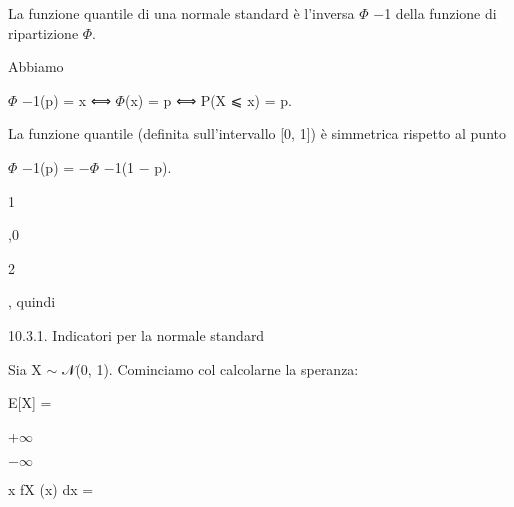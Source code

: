 \documentclass[a4paper,portrait,12pt]{article}
\begin{document}
\begin{flushleft}
La funzione quantile di una normale standard \`{e} l'inversa $\Phi$ $-$1 della funzione di ripartizione $\Phi$.
\end{flushleft}


\begin{flushleft}
Abbiamo
\end{flushleft}


\begin{flushleft}
$\Phi$ $-$1(p) = x ⟺ $\Phi$(x) = p ⟺ P(X ⩽ x) = p.
\end{flushleft}


\begin{flushleft}
La funzione quantile (definita sull'intervallo [0, 1]) \`{e} simmetrica rispetto al punto
\end{flushleft}


\begin{flushleft}
$\Phi$ $-$1(p) = $-$$\Phi$ $-$1(1 $-$ p).
\end{flushleft}





1


,0


2





\begin{flushleft}
, quindi
\end{flushleft}





\begin{flushleft}
10.3.1. Indicatori per la normale standard
\end{flushleft}


\begin{flushleft}
Sia X $\sim$ 𝒩(0, 1). Cominciamo col calcolarne la speranza:
\end{flushleft}


\begin{flushleft}
E[X] =
\end{flushleft}





+$\infty$


$-$$\infty$





\begin{flushleft}
x fX (x) dx =
\end{flushleft}
\end{document}
